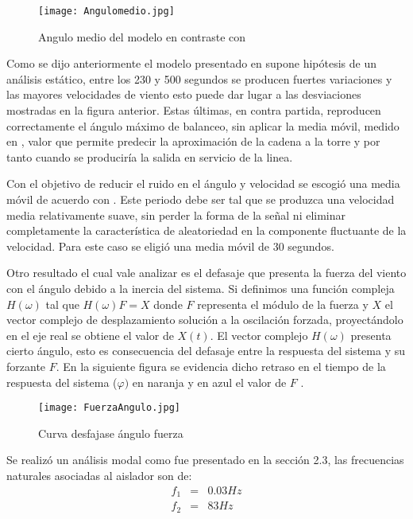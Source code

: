 \begin{figure}[h]
	\centering
	\texttt{[image: Angulomedio.jpg]}
	\caption{Angulo medio del modelo en contraste con  \cite{stengel2017measurements}   }
\end{figure}

Como se dijo anteriormente el modelo presentado en  \cite{stengel2017measurements} supone hipótesis de un análisis estático, entre los 230 y 500 segundos se producen fuertes variaciones y las mayores velocidades de viento esto puede dar lugar a las desviaciones mostradas en la figura anterior. Estas últimas, en contra partida, reproducen correctamente el ángulo máximo de balanceo, sin aplicar la media móvil, medido en \cite{stengel2017measurements}, valor que permite predecir la aproximación de la cadena a la torre y por tanto cuando se produciría la salida en servicio de la linea. 

Con el objetivo de reducir el ruido en el ángulo y velocidad se escogió una media móvil de acuerdo con \cite{stengel2017measurements}. Este periodo debe ser tal que se produzca una velocidad media relativamente suave, sin perder la forma de la señal ni eliminar completamente la característica de aleatoriedad en la componente fluctuante de la velocidad. Para este caso se eligió una media móvil de 30 segundos.

Otro resultado el cual vale analizar es el defasaje que presenta la fuerza del viento con el ángulo debido a la inercia del sistema. Si definimos una función compleja $H(\omega)$ tal que $H(\omega)F=X$ donde $F$ representa el módulo de la fuerza y $X$ el vector complejo de desplazamiento solución a la oscilación forzada, proyectándolo en el eje real se obtiene el valor de $X(t)$. El vector complejo $H(\omega)$ presenta cierto ángulo, esto es consecuencia del defasaje entre la respuesta del sistema y su forzante $F$. En la siguiente figura se evidencia dicho retraso en el tiempo de la respuesta del sistema ($ \varphi) $ en naranja y en azul el valor de $F$ .


\begin{figure}[h]
	\centering
	\texttt{[image: FuerzaAngulo.jpg]}
	\caption{Curva desfajase ángulo fuerza}
\end{figure}


Se realizó un análisis modal como fue presentado en la sección 2.3, las frecuencias naturales asociadas al aislador son de:
\begin{eqnarray}
	f_1&=&0.03Hz\\
	f_2&=&83Hz
\end{eqnarray}


